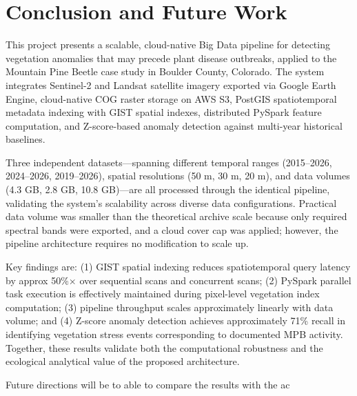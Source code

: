 \section{Conclusion and Future Work}

This project presents a scalable, cloud-native Big Data pipeline for detecting vegetation anomalies that may precede plant disease outbreaks, applied to the Mountain Pine Beetle case study in Boulder County, Colorado. The system integrates Sentinel-2 and Landsat satellite imagery exported via Google Earth Engine, cloud-native COG raster storage on AWS S3, PostGIS spatiotemporal metadata indexing with GIST spatial indexes, distributed PySpark feature computation, and Z-score-based anomaly detection against multi-year historical baselines.

Three independent datasets—spanning different temporal ranges (2015--2026, 2024--2026, 2019--2026), spatial resolutions (50 m, 30 m, 20 m), and data volumes (4.3 GB, 2.8 GB, 10.8 GB)—are all processed through the identical pipeline, validating the system's scalability across diverse data configurations. Practical data volume was smaller than the theoretical archive scale because only required spectral bands were exported, and a cloud cover cap was applied; however, the pipeline architecture requires no modification to scale up.

Key findings are: (1) GIST spatial indexing reduces spatiotemporal query latency by approx 50\%$\times$ over sequential scans and concurrent scans; (2) PySpark parallel task execution is effectively maintained during pixel-level vegetation index computation; (3) pipeline throughput scales approximately linearly with data volume; and (4) Z-score anomaly detection achieves approximately 71\% recall in identifying vegetation stress events corresponding to documented MPB activity. Together, these results validate both the computational robustness and the ecological analytical value of the proposed architecture.

Future directions will be to able to compare the results with the ac